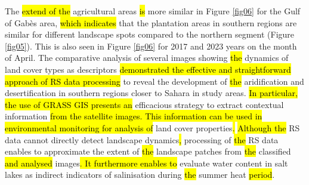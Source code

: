 \documentclass[land,article,submit,pdftex,moreauthors]{Definitions/mdpi}
\begin{document}
The \hl{extend of the }agricultural areas \hl{is }more similar in Figure \ref{fig06} for the Gulf of Gabès area, \hl{which indicates} that the plantation areas in southern regions are\hl{ }similar for different landscape spots compared to the northern segment (Figure \ref{fig05}). This is also seen in Figure \ref{fig06} for 2017 and 2023 years on the month of April. The\hl{ }comparative analysis of several images showing \hl{the }dynamics of land cover types as descriptors \hl{demonstrated the effective and straightforward approach of RS data processing }to reveal the development of \hl{the }aridification and desertification in southern regions closer to Sahara in study areas. \hl{In particular, the use of GRASS GIS presents an} efficacious strategy to extract contextual information \hl{from the satellite images. This information can be used in environmental monitoring for analysis of }land cover properties\hl{. }\hl{Although the} RS data cannot directly detect landscape dynamics\hl{, }processing of \hl{the }RS data enables to approximate the extent of \hl{the }landscape patches from \hl{the }classified \hl{and analysed }images\hl{. It furthermore enables to} evaluate water content in salt lakes as indirect indicators of salinisation during \hl{the }summer heat \hl{period}. 
\end{document}
